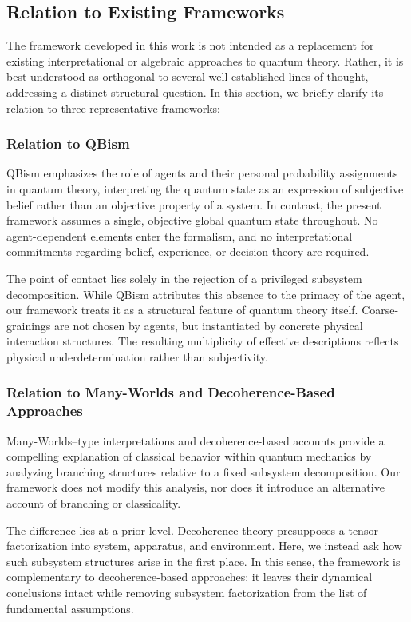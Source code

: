 \documentclass[12pt,a4paper,openany]{book}
\begin{document}
\subsection{Relation to Existing Frameworks}

The framework developed in this work is not intended as a replacement for existing interpretational or algebraic approaches to quantum theory.
Rather, it is best understood as orthogonal to several well-established lines of thought, addressing a distinct structural question.
In this section, we briefly clarify its relation to three representative frameworks:

\subsubsection{Relation to QBism}

QBism emphasizes the role of agents and their personal probability assignments in quantum theory, interpreting the quantum state as an expression of subjective belief rather than an objective property of a system.
In contrast, the present framework assumes a single, objective global quantum state throughout.
No agent-dependent elements enter the formalism, and no interpretational commitments regarding belief, experience, or decision theory are required.

The point of contact lies solely in the rejection of a privileged subsystem decomposition.
While QBism attributes this absence to the primacy of the agent, our framework treats it as a structural feature of quantum theory itself.
Coarse-grainings are not chosen by agents, but instantiated by concrete physical interaction structures.
The resulting multiplicity of effective descriptions reflects physical underdetermination rather than subjectivity.

\subsubsection{Relation to Many-Worlds and Decoherence-Based Approaches}

Many-Worlds--type interpretations and decoherence-based accounts provide a compelling explanation of classical behavior within quantum mechanics by analyzing branching structures relative to a fixed subsystem decomposition.
Our framework does not modify this analysis, nor does it introduce an alternative account of branching or classicality.

The difference lies at a prior level.
Decoherence theory presupposes a tensor factorization into system, apparatus, and environment.
Here, we instead ask how such subsystem structures arise in the first place.
In this sense, the framework is complementary to decoherence-based approaches: it leaves their dynamical conclusions intact while removing subsystem factorization from the list of fundamental assumptions.
\end{document}
